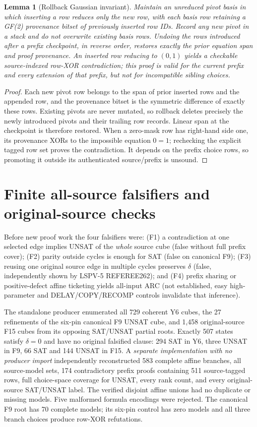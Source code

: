 \documentclass[11pt]{article}
\newtheorem{lemma}{Lemma}
\begin{document}
\begin{lemma}[Rollback Gaussian invariant]\label{lem:rollback}
Maintain an unreduced pivot basis in which inserting a row reduces only the \emph{new} row, with each basis row retaining a GF(2) provenance bitset of previously inserted row IDs. Record any new pivot in a stack and do not overwrite existing basis rows. Undoing the rows introduced after a prefix checkpoint, in reverse order, restores exactly the prior equation span and proof provenance. An inserted row reducing to $(0,1)$ yields a checkable source-indexed row-XOR contradiction; this proof is valid for the current prefix and every extension of that prefix, but not for incompatible sibling choices.
\end{lemma}
\begin{proof}
Each new pivot row belongs to the span of prior inserted rows and the appended row, and the provenance bitset is the symmetric difference of exactly these rows. Existing pivots are never mutated, so rollback deletes precisely the newly introduced pivots and their trailing row records. Linear span at the checkpoint is therefore restored. When a zero-mask row has right-hand side one, its provenance XORs to the impossible equation $0=1$; rechecking the explicit tagged row set proves the contradiction. It depends on the prefix choice rows, so promoting it outside its authenticated source/prefix is unsound.
\end{proof}

\section{Finite all-source falsifiers and original-source checks}
Before new proof work the four falsifiers were: (F1) a contradiction at one selected edge implies UNSAT of the \emph{whole} source cube (false without full prefix cover); (F2) parity outside cycles is enough for SAT (false on canonical F9); (F3) reusing one original source edge in multiple cycles preserves $\delta$ (false, independently shown by LSPV-5 REFEREE262); and (F4) prefix sharing or positive-defect affine ticketing yields all-input ARC (not established, easy high-parameter and DELAY/COPY/RECOMP controls invalidate that inference).

The standalone producer enumerated all 729 coherent Y6 cubes, the 27 refinements of the six-pin canonical F9 UNSAT cube, and 1,458 original-source F15 cubes from its opposing SAT/UNSAT partial roots. Exactly 507 states satisfy $\delta=0$ and have no original falsified clause: 294 SAT in Y6, three UNSAT in F9, 66 SAT and 144 UNSAT in F15. A \emph{separate implementation with no producer import} independently reconstructed 583 complete affine branches, all source-model sets, 174 contradictory prefix proofs containing 511 source-tagged rows, full choice-space coverage for UNSAT, every rank count, and every original-source SAT/UNSAT label. The verified disjoint affine unions had no duplicate or missing models. Five malformed formula encodings were rejected. The canonical F9 root has 70 complete models; its six-pin control has zero models and all three branch choices produce row-XOR refutations.
\end{document}
